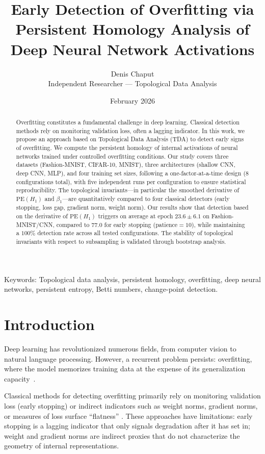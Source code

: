 \documentclass[11pt,a4paper]{article}
\title{%
  \textbf{Early Detection of Overfitting via Persistent Homology Analysis
  of Deep Neural Network Activations}
}
\author{%
  Denis Chaput\\
  {\small Independent Researcher --- Topological Data Analysis}
}
\date{February 2026}
\newcommand{\betti}{\beta}
\newcommand{\PE}{\mathrm{PE}}
\newcommand{\ecart}{\pm}
\begin{document}
\maketitle

\begin{abstract}
Overfitting constitutes a fundamental challenge in deep learning.
Classical detection methods rely on monitoring validation loss, often
a lagging indicator. In this work, we propose an approach based on
Topological Data Analysis (TDA) to detect early signs of
overfitting. We compute the persistent homology of internal activations
of neural networks trained under controlled overfitting conditions. Our
study covers three datasets (Fashion-MNIST, CIFAR-10, MNIST), three
architectures (shallow CNN, deep CNN, MLP), and four training set sizes,
following a one-factor-at-a-time design (8 configurations total),
with five independent runs per configuration to ensure statistical
reproducibility. The topological invariants---in particular the smoothed
derivative of $\PE(H_1)$ and $\betti_1$---are quantitatively compared
to four classical detectors (early stopping, loss gap, gradient norm,
weight norm). Our results show that detection based on the derivative
of $\PE(H_1)$ triggers on average at epoch $23.6 \ecart 6.1$ on
Fashion-MNIST/CNN, compared to $77.0$ for early stopping (patience${}=10$),
while maintaining a $100\%$ detection rate across all tested configurations.
The stability of topological invariants with respect to subsampling is
validated through bootstrap analysis.
\end{abstract}

Keywords: Topological data analysis, persistent homology,
overfitting, deep neural networks, persistent entropy, Betti numbers,
change-point detection.

\section{Introduction}
\label{sec:introduction}

Deep learning has revolutionized numerous fields, from computer vision
to natural language processing. However, a recurrent problem persists:
overfitting, where the model memorizes training data at the
expense of its generalization capacity~\cite{naitzat2020topologydeepneuralnetworks}.

Classical methods for detecting overfitting primarily rely on monitoring
validation loss (early stopping) or indirect indicators such as weight
norms, gradient norms, or measures of loss surface ``flatness''
\cite{foret2021sharpnessawareminimizationefficientlyimproving}. These approaches have limitations:
early stopping is a lagging indicator that only signals degradation after
it has set in; weight and gradient norms are indirect proxies that do not
characterize the geometry of internal representations.
\end{document}
